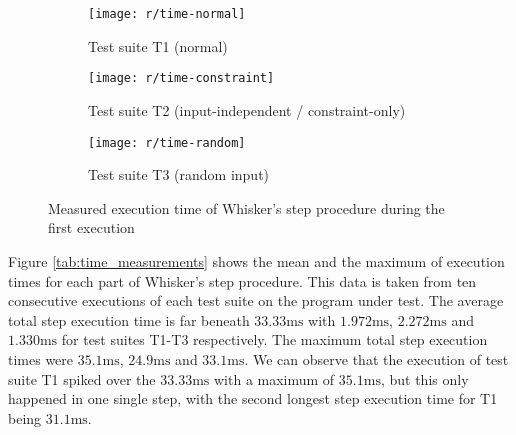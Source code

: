 \begin{figure}[htpb]
    \centering

    \begin{subfigure}{\textwidth}
        \centering
        \texttt{[image: r/time-normal]}
        \vspace{-\medskipamount}
        \caption{Test suite T1 (normal)}
    \end{subfigure}

    \begin{subfigure}{\textwidth}
        \centering
        \texttt{[image: r/time-constraint]}
        \vspace{-\medskipamount}
        \caption{Test suite T2 (input-independent / constraint-only)}
    \end{subfigure}

    \begin{subfigure}{\textwidth}
        \centering
        \texttt{[image: r/time-random]}
        \vspace{-\medskipamount}
        \caption{Test suite T3 (random input)}
    \end{subfigure}

    \caption{Measured execution time of Whisker's step procedure during the first execution}
    \label{fig:time_line_plot}
\end{figure}

\clearpage

Figure \ref{tab:time_measurements} shows the mean and the maximum of execution times for each part of Whisker's step procedure.
This data is taken from ten consecutive executions of each test suite on the program under test.
The average total step execution time is far beneath $33.33\text{ms}$ with $1.972\text{ms}$, $2.272\text{ms}$ and $1.330\text{ms}$ for test suites T1-T3 respectively.
The maximum total step execution times were $35.1\text{ms}$, $24.9\text{ms}$ and $33.1\text{ms}$.
We can observe that the execution of test suite T1 spiked over the $33.33\text{ms}$ with a maximum of $35.1\text{ms}$,
but this only happened in one single step, with the second longest step execution time for T1 being $31.1\text{ms}$.

%

